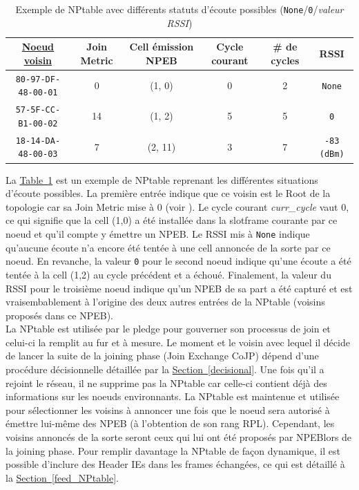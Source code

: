\documentclass[]{report}
\newcommand{\wordlink}[2]{\hyperref[#2]{#1~\ref{#2}}}
\begin{document}
\begin{table}[h]
\centering
\begin{tabular}{|c|c|c|c|c|c|}
	\hline
    \textbf{\underline{Noeud voisin}} & \textbf{Join Metric} & \textbf{Cell émission NPEB} & \textbf{Cycle courant} & \textbf{\# de cycles} & \textbf{RSSI}\\
    \hline
    \texttt{80-97-DF-48-00-01} & 0 & (1, 0) & 0 & 2 & \texttt{None}\\
    \hline
    \texttt{57-5F-CC-B1-00-02} & 14 & (1, 2) & 5 & 5 & \texttt{0}\\
    \hline
    \texttt{18-14-DA-48-00-03} & 7 & (2, 11) & 3 & 7 & \texttt{-83 (dBm)}\\
    \hline
\end{tabular}
\caption{Exemple de NPtable avec différents statuts d'écoute possibles (\texttt{None}/\texttt{0}/\textit{valeur RSSI})}
\label{NPtable}
\end{table}
\vspace{0.5cm}

La \wordlink{Table}{NPtable} est un exemple de NPtable reprenant les différentes situations d'écoute possibles. La première entrée indique que ce voisin est le Root de la topologie car sa Join Metric mise à 0 (voir \cite{rfc8180}). Le cycle courant \textit{curr\_cycle} vaut 0, ce qui signifie que la cell (1,0) a été installée dans la slotframe courante par ce noeud et qu'il compte y émettre un NPEB. Le RSSI mis à \texttt{None} indique qu'aucune écoute n'a encore été tentée à une cell annoncée de la sorte par ce noeud. En revanche, la valeur \texttt{0} pour le second noeud indique qu'une écoute a été tentée à la cell (1,2) au cycle précédent et a échoué. Finalement, la valeur du RSSI pour le troisième noeud indique qu'un NPEB de sa part a été capturé et est vraisembablement à l'origine des deux autres entrées de la NPtable (voisins proposés dans ce NPEB).\\

La NPtable est utilisée par le pledge pour gouverner son processus de join et celui-ci la remplit au fur et à mesure. Le moment et le voisin avec lequel il décide de lancer la suite de la joining phase (Join Exchange CoJP) dépend d'une procédure décisionnelle détaillée par la \wordlink{Section}{decisional}. Une fois qu'il a rejoint le réseau, il ne supprime pas la NPtable car celle-ci contient déjà des informations sur les noeuds environnants. La NPtable est maintenue et utilisée pour sélectionner les voisins à annoncer une fois que le noeud sera autorisé à émettre lui-même des NPEB (à l'obtention de son rang RPL). Cependant, les voisins annoncés de la sorte seront ceux qui lui ont été proposés par NPEBlors de la joining phase. Pour remplir davantage la NPtable de façon dynamique, il est possible d'inclure des Header IEs dans les frames échangées, ce qui est détaillé à la \wordlink{Section}{feed_NPtable}.
\end{document}
